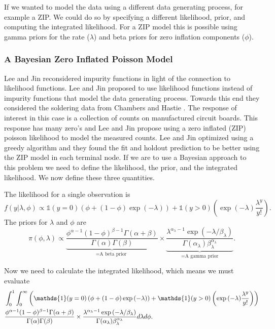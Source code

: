 If we wanted to model the data using a different data generating process, for example a ZIP. We could do so by specifying a different likelihood, prior, and computing the integrated likelihood. For a ZIP model this is possible using gamma priors for the rate ($\lambda$) and beta priors for zero inflation components ($\phi$). 
 
 \subsubsection{A Bayesian Zero Inflated Poisson Model}
 
 Lee and Jin \cite{lee2006decision} reconsidered impurity functions in light of the connection to likelihood functions. Lee and Jin \cite{lee2006decision} proposed to use likelihood functions instead of impurity functions that model the data generating process. Towards this end they considered the soldering data from Chambers and Hastie \cite{chambers1992statistical}. The response of interest in this case is a collection of counts on manufactured circuit boards. This response has many zero's and Lee and Jin \cite{lee2006decision} propose using a zero inflated (ZIP) poisson likelihood to model the measured counts. Lee and Jin \cite{lee2006decision} optimized using a greedy algorithm and they found the fit and holdout prediction to be better using the ZIP model in each terminal node. If we are to use a Bayesian approach to this problem we need to define the likelihood, the prior, and the integrated likelihood. We now define these three quantities.
 
 The likelihood for a single observation is 
 \begin{equation}
 f(y\vert \lambda, \phi) \propto \mathds{1}(y=0)\left(\phi + (1-\phi)\exp{(-\lambda)}\right) + \mathds{1}(y>0)\left(\exp{(-\lambda)}\frac{\lambda^y}{y!}\right).
 \end{equation}
 The priors for $\lambda$ and $\phi$ are
 \begin{equation}
 \pi(\phi, \lambda)\propto \underbrace{\frac{\phi^{\alpha-1}(1-\phi)^{\beta-1}\Gamma(\alpha+\beta)}{\Gamma(\alpha)\Gamma(\beta)}}_{=\text{A beta prior }} \times \underbrace{\frac{ \lambda^{\alpha_{\lambda}-1}\exp{(-\lambda/\beta_{\lambda})} }{\Gamma(\alpha_{\lambda})\beta_{\lambda}^{\alpha_{\lambda}}}}_{=\text{A gamma prior}}.
 \end{equation}

 Now we need to calculate the integrated likelihood, which means we must evaluate 
 \begin{align} \hspace{-.9in}
 &\int_0^1\int_0^\infty \left(\mathds{1}(y=0)\left(\phi + (1-\phi)\exp{(-\lambda)}\right) + \mathds{1}(y>0)\left(\exp{(-\lambda)}\frac{\lambda^y}{y!}\right)\right) \\ \nonumber
 & \frac{\phi^{\alpha-1}(1-\phi)^{\beta-1}\Gamma(\alpha+\beta)}{\Gamma(\alpha)\Gamma(\beta)} \times \frac{ \lambda^{\alpha_{\lambda}-1}\exp{(-\lambda/\beta_{\lambda})} }{\Gamma(\alpha_{\lambda})\beta_{\lambda}^{\alpha_{\lambda}}}d\lambda d\phi.
 \end{align}
 
